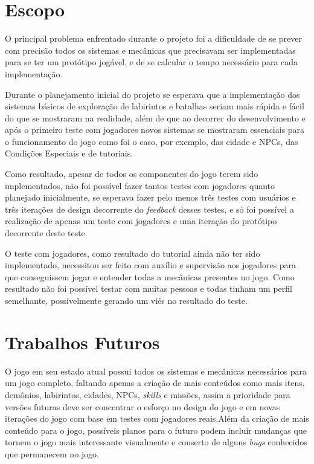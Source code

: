 \section{Escopo}

	O principal problema enfrentado durante o projeto foi a dificuldade de se prever com precisão todos os sistemas e mecânicas que precisavam ser implementadas para se ter um protótipo jogável, e de se calcular o tempo necessário para cada implementação.
	
	Durante o planejamento inicial do projeto se esperava que a implementação dos sistemas básicos de exploração de labirintos e batalhas seriam mais rápida e fácil do que se mostraram na realidade, além de que ao decorrer do desenvolvimento e após o primeiro teste com jogadores novos sistemas se mostraram essenciais para o funcionamento do jogo como foi o caso, por exemplo, das cidade e NPCs, das Condições Especiais e de tutoriais.
	
	Como resultado, apesar de todos os componentes do jogo terem sido implementados, não foi possível fazer tantos testes com jogadores quanto planejado inicialmente, se esperava fazer pelo menos três testes com usuários e três iterações de design decorrente do \emph{feedback} desses testes, e só foi possível a realização de apenas um teste com jogadores e uma iteração do protótipo decorrente deste teste.

	O teste com jogadores, como resultado do tutorial ainda não ter sido implementado, necessitou ser feito com auxílio e supervisão aos jogadores para que conseguissem jogar e entender todas a mecânicas presentes no jogo. Como resultado não foi possível testar com muitas pessoas e todas tinham um perfil semelhante, possivelmente gerando um viés no resultado do teste.

\section{Trabalhos Futuros}

	O jogo em seu estado atual possui todos os sistemas e mecânicas necessários para um jogo completo, faltando apenas a criação de mais conteúdos como mais itens, demônios, labirintos, cidades, NPCs, \emph{skills} e missões, assim a prioridade para versões futuras deve ser concentrar o esforço no design do jogo e em novas iterações do jogo com base em testes com jogadores reais.Além da criação de mais conteúdo para o jogo, possíveis planos para o futuro podem incluir mudanças que tornem o jogo mais interessante visualmente e conserto de alguns \emph{bugs} conhecidos que permanecem no jogo.

